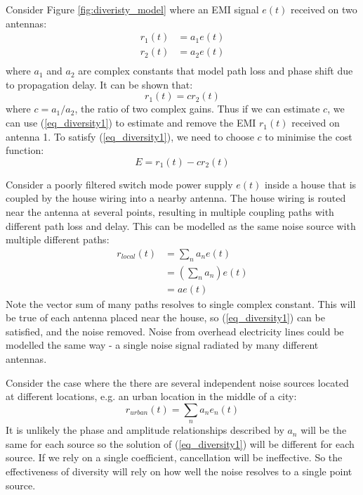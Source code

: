 \documentclass{article}
\begin{document}
Consider Figure \ref{fig:diveristy_model} where an EMI signal $e(t)$ received on two antennas:
\begin{equation}
\begin{split}
r_1(t) &= a_1 e(t) \\
r_2(t) &= a_2 e(t) \\
\end{split}
\end{equation}
where $a_1$ and $a_2$ are complex constants that model path loss and phase shift due to propagation delay. It can be shown that:
\begin{equation} \label{eq_diversity1}
r_1(t) = cr_2(t)
\end{equation}
where $c=a_1/a_2$, the ratio of two complex gains.  Thus if we can estimate $c$, we can use (\ref{eq_diversity1}) to estimate and remove the EMI $r_1(t)$ received on antenna 1. To satisfy (\ref{eq_diversity1}), we need to choose $c$ to minimise the cost function:
\begin{equation} 
E = r_1(t) - cr_2(t)
\end{equation}

Consider a poorly filtered switch mode power supply $e(t)$ inside a house that is coupled by the house wiring into a nearby antenna.  The house wiring is routed near the antenna at several points, resulting in multiple coupling paths with different path loss and delay. This can be modelled as the same noise source with multiple different paths:
\begin{equation}
\begin{split}
r_{local}(t) &= \sum_n a_n e(t) \\
     &= \left( \sum_n a_n \right) e(t) \\
     &= a e(t)
\end{split}
\end{equation}
Note the vector sum of many paths resolves to single complex constant.  This will be true of each antenna placed near the house, so (\ref{eq_diversity1}) can be satisfied, and the noise removed. Noise from overhead electricity lines could be modelled the same way - a single noise signal radiated by many different antennas.

Consider the case where the there are several independent noise sources located at different locations, e.g. an urban location in the middle of a city:
\begin{equation}
r_{urban}(t) = \sum_n a_n e_n(t)
\end{equation}
It is unlikely the phase and amplitude relationships described by $a_n$ will be the same for each source so the solution of (\ref{eq_diversity1}) will be different for each source.  If we rely on a single coefficient, cancellation will be ineffective.  So the effectiveness of diversity will rely on how well the noise resolves to a single point source.
\end{document}
